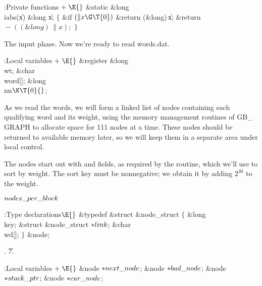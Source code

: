 \B{}:Private functions\X${}\mathrel+\E{}$\6
\1\1\&{static} \&{long} \\{iabs}(\|x)\6
\&{long} \|x;\2\2\6
${}\{{}$\5
\1\&{if} ${}(\|x\G\T{0}){}$\1\5
\&{return} (\&{long})\,\|x;\2\6
\&{return} ${}{-}((\&{long})\,\|x);{}$\6
\4${}\}{}$\2\par
\fi

The input phase. Now we're ready to read \.{words.dat}.

\Y\B\4:Local variables\X${}\mathrel+\E{}$\6
\&{register} \&{long} \\{wt};\6
\&{char} \\{word}[];\6
\&{long} \\{nn}${}\K\T{0}{}$;%
\par
\fi

As we read the words, we will form a linked list of nodes containing
each qualifying word and its weight, using the memory management
routines of {\sc GB\_\,GRAPH} to allocate space for 111 nodes at a
time. These nodes should be returned to available memory later, so we
will keep them in a separate area under local control.

The nodes start out with  and  fields, as required by
the
 routine, which we'll use to sort by weight. The sort key
must be
nonnegative; we obtain it by adding $2^{30}$ to the weight.

\Y\B\4\D$\\{nodes\_per\_block}$ \5
\par
\Y\B\4:Type declarations\X${}\E{}$\6
\&{typedef} \&{struct} \&{node\_struct} ${}\{{}$\1\6
\&{long} \\{key};\6
\&{struct} \&{node\_struct} ${}{*}\\{link}{}$;\6
\&{char} \\{wd}[];\2\6
${}\}{}$ \&{node};\par
{}.
\U7.\fi

\B{}:Local variables\X${}\mathrel+\E{}$\6
\&{node} ${}{*}\\{next\_node}{}$;\6
\&{node} ${}{*}\\{bad\_node}{}$;\6
\&{node} ${}{*}\\{stack\_ptr}{}$;\6
\&{node} ${}{*}\\{cur\_node}{}$;\par
\fi

